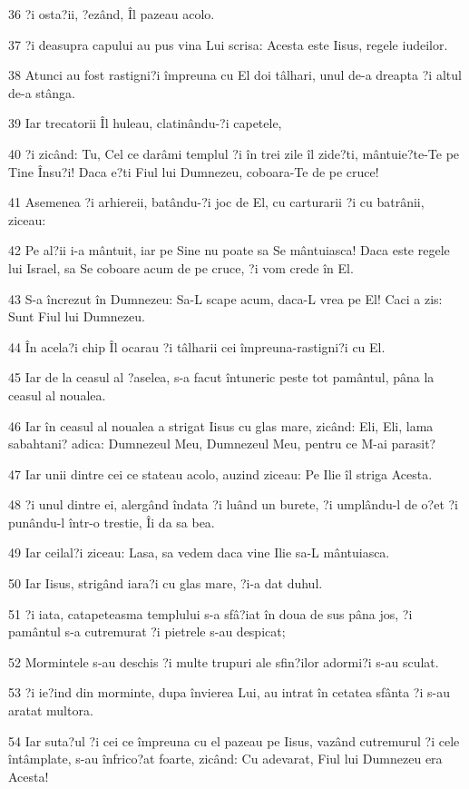 \par 36 ?i osta?ii, ?ezând, Îl pazeau acolo.
\par 37 ?i deasupra capului au pus vina Lui scrisa: Acesta este Iisus, regele iudeilor.
\par 38 Atunci au fost rastigni?i împreuna cu El doi tâlhari, unul de-a dreapta ?i altul de-a stânga.
\par 39 Iar trecatorii Îl huleau, clatinându-?i capetele,
\par 40 ?i zicând: Tu, Cel ce darâmi templul ?i în trei zile îl zide?ti, mântuie?te-Te pe Tine Însu?i! Daca e?ti Fiul lui Dumnezeu, coboara-Te de pe cruce!
\par 41 Asemenea ?i arhiereii, batându-?i joc de El, cu carturarii ?i cu batrânii, ziceau:
\par 42 Pe al?ii i-a mântuit, iar pe Sine nu poate sa Se mântuiasca! Daca este regele lui Israel, sa Se coboare acum de pe cruce, ?i vom crede în El.
\par 43 S-a încrezut în Dumnezeu: Sa-L scape acum, daca-L vrea pe El! Caci a zis: Sunt Fiul lui Dumnezeu.
\par 44 În acela?i chip Îl ocarau ?i tâlharii cei împreuna-rastigni?i cu El.
\par 45 Iar de la ceasul al ?aselea, s-a facut întuneric peste tot pamântul, pâna la ceasul al noualea.
\par 46 Iar în ceasul al noualea a strigat Iisus cu glas mare, zicând: Eli, Eli, lama sabahtani? adica: Dumnezeul Meu, Dumnezeul Meu, pentru ce M-ai parasit?
\par 47 Iar unii dintre cei ce stateau acolo, auzind ziceau: Pe Ilie îl striga Acesta.
\par 48 ?i unul dintre ei, alergând îndata ?i luând un burete, ?i umplându-l de o?et ?i punându-l într-o trestie, Îi da sa bea.
\par 49 Iar ceilal?i ziceau: Lasa, sa vedem daca vine Ilie sa-L mântuiasca.
\par 50 Iar Iisus, strigând iara?i cu glas mare, ?i-a dat duhul.
\par 51 ?i iata, catapeteasma templului s-a sfâ?iat în doua de sus pâna jos, ?i pamântul s-a cutremurat ?i pietrele s-au despicat;
\par 52 Mormintele s-au deschis ?i multe trupuri ale sfin?ilor adormi?i s-au sculat.
\par 53 ?i ie?ind din morminte, dupa învierea Lui, au intrat în cetatea sfânta ?i s-au aratat multora.
\par 54 Iar suta?ul ?i cei ce împreuna cu el pazeau pe Iisus, vazând cutremurul ?i cele întâmplate, s-au înfrico?at foarte, zicând: Cu adevarat, Fiul lui Dumnezeu era Acesta!
